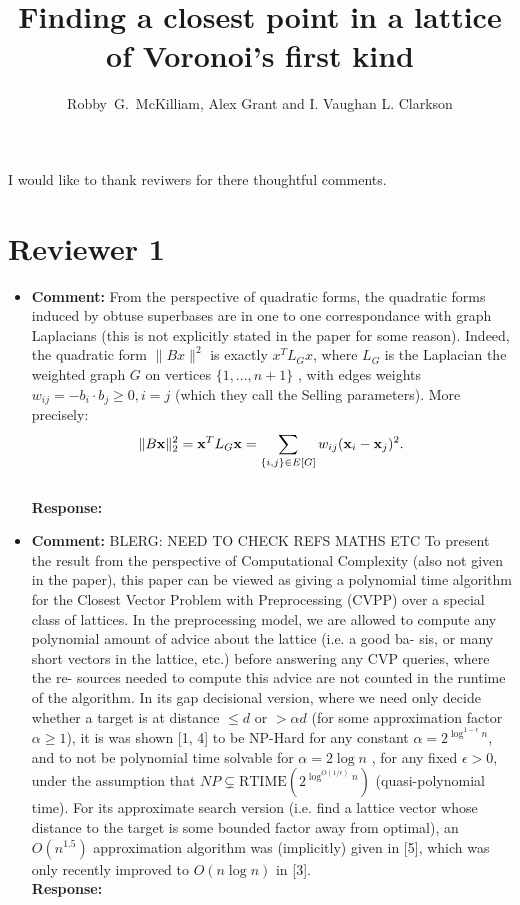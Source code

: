 \documentclass[a4paper,10pt]{article}
\title{Finding a closest point in a lattice of Voronoi's first kind}
\author{Robby~G.~McKilliam, Alex Grant and I. Vaughan L. Clarkson
}
\begin{document}
\maketitle

I would like to thank reviwers for there thoughtful comments.  %


\section*{Reviewer 1}\label{sec:reviewer-1}

\begin{itemize}

\item\textbf{Comment:} 
From the perspective of quadratic forms, the quadratic forms induced by obtuse superbases are in one to one correspondance with graph Laplacians (this is not
explicitly stated in the paper for some reason). Indeed, the quadratic form $\|Bx\|^2$ is exactly $x^T L_G x$, where $L_G$ is the Laplacian the weighted graph $G$ on vertices $\{ 1, . . . , n + 1 \}$ , with edges weights $w_{ij} = -b_i \cdot b_j \geq 0, i = j$ (which they call the Selling parameters). More precisely:
\[
\|B\mathbf{x}\|_2^2 = \mathbf{x}^T L_G \mathbf{x} = \sum_{ \{i,j\} \in E[G] } w_{ij} (\mathbf{x}_{i} - \mathbf{x}_{j} )^2.
\]
\\ \textbf{Response:}

\item\textbf{Comment:} 
BLERG: NEED TO CHECK REFS MATHS ETC To present the result from the perspective of Computational Complexity (also not given in the
paper), this paper can be viewed as giving a polynomial time algorithm for the Closest Vector
Problem with Preprocessing (CVPP) over a special class of lattices. In the preprocessing model,
we are allowed to compute any polynomial amount of advice about the lattice (i.e. a good ba-
sis, or many short vectors in the lattice, etc.) before answering any CVP queries, where the re-
sources needed to compute this advice are not counted in the runtime of the algorithm. In its
gap decisional version, where we need only decide whether a target is at distance $\leq d$ or $> \alpha d$
(for some approximation factor $α \geq 1$), it is was shown [1, 4] to be NP-Hard for any constant $\alpha = 2^{\log^{1-\epsilon}n}$, and to not be polynomial time solvable for $\alpha = 2 \log n$ , for any fixed $\epsilon > 0$, under the assumption  that $NP \subsetneq \text{RTIME}(2^{\log^{O(1/\epsilon)}n})$ (quasi-polynomial time). For its approximate search version (i.e. find a lattice vector whose distance to the target is some bounded factor away from optimal), an
$O( n^{1.5} )$ approximation algorithm was (implicitly) given in [5], which was only recently improved to $O( n \log n )$ in [3].
\\\textbf{Response:}


\end{itemize}
\end{document}
